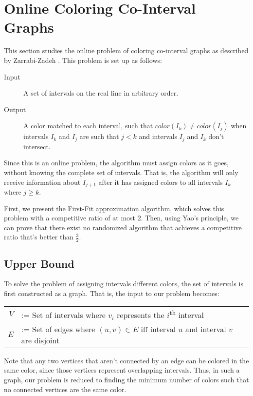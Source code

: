 \section{Online Coloring Co-Interval Graphs}
This section studies the online problem of coloring co-interval graphs as described by Zarrabi-Zadeh \cite{zarrabi}.
This problem is set up as follows:

\begin{description}
	\item[Input] A set of intervals on the real line in arbitrary order.
	\item[Output] A color matched to each interval, such that $color(I_k) \neq color(I_j)$ when intervals $I_k$ and $I_j$ are such that $j < k$ and intervals $I_j$ and $I_k$ don't intersect.
\end{description}

Since this is an online problem, the algorithm must assign colors as it goes, without knowing the complete set of intervals. That is, the algorithm will only receive information about $I_{j+1}$ after it has assigned colors to all intervals $I_k$ where $j \geq k$.

First, we present the First-Fit approximation algorithm, which solves this problem with a competitive ratio of at most 2. Then, using Yao's principle, we can prove that there exist no randomized algorithm that achieves a competitive ratio that's better than $\frac{3}{2}$.

\subsection{Upper Bound}
To solve the problem of assigning intervals different colors, the set of intervals is first constructed as a graph. That is, the input to our problem becomes:

\begin{center}
	\begin{tabular}{rl}
		$V$ &:= Set of intervals where $v_i$ represents the $i$\textsuperscript{th} interval \\
		$E$ &:= Set of edges where $(u,v) \in E$ iff interval $u$ and interval $v$ are disjoint
	\end{tabular}
\end{center}

Note that any two vertices that aren't connected by an edge can be colored in the same color, since those vertices represent overlapping intervals. Thus, in such a graph, our problem is reduced to finding the minimum number of colors such that no connected vertices are the same color.

